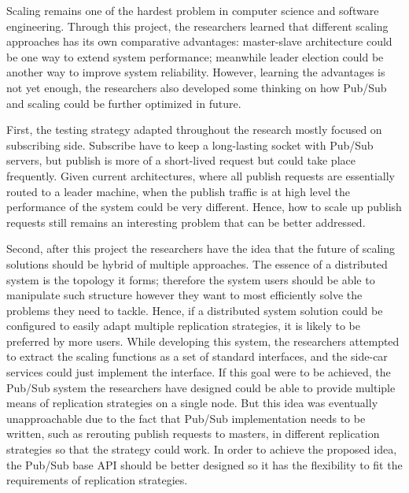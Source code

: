 Scaling remains one of the hardest problem in computer science and software engineering. Through this project, the researchers learned that different scaling approaches has its own comparative advantages: master-slave architecture could be one way to extend system performance; meanwhile leader election could be another way to improve system reliability. However, learning the advantages is not yet enough, the researchers also developed some thinking on how Pub/Sub and scaling could be further optimized in future.

First, the testing strategy adapted throughout the research mostly focused on subscribing side. Subscribe have to keep a long-lasting socket with Pub/Sub servers, but publish is more of a short-lived request but could take place frequently. Given current architectures, where all publish requests are essentially routed to a leader machine, when the publish traffic is at high level the performance of the system could be very different. Hence, how to scale up publish requests still remains an interesting problem that can be better addressed.

Second, after this project the researchers have the idea that the future of scaling solutions should be hybrid of multiple approaches. The essence of a distributed system is the topology it forms; therefore the system users should be able to manipulate such structure however they want to most efficiently solve the problems they need to tackle. Hence, if a distributed system solution could be configured to easily adapt multiple replication strategies, it is likely to be preferred by more users. While developing this system, the researchers attempted to extract the scaling functions as a set of standard interfaces, and the side-car services could just implement the interface. If this goal were to be achieved, the Pub/Sub system the researchers have designed could be able to provide multiple means of replication strategies on a single node. But this idea was eventually unapproachable due to the fact that Pub/Sub implementation needs to be written, such as rerouting publish requests to masters, in different replication strategies so that the strategy could work. In order to achieve the proposed idea, the Pub/Sub base API should be better designed so it has the flexibility to fit the requirements of replication strategies.


